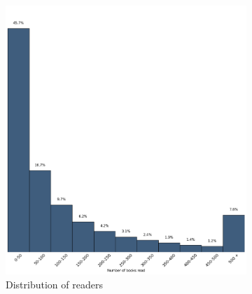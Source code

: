 \documentclass[11pt]{article}
\begin{document}


\begin{figure}[ht]
        \centering
        \begin{subfigure}[b]{0.5\textwidth}
                \includegraphics[width=\textwidth]{images/users}
                \caption{Distribution of readers}
                \label{fig:readers_book_read}
        \end{subfigure}%
        ~ %
        \begin{subfigure}[b]{0.5\textwidth}

\end{subfigure}
\end{figure}
\end{document}
